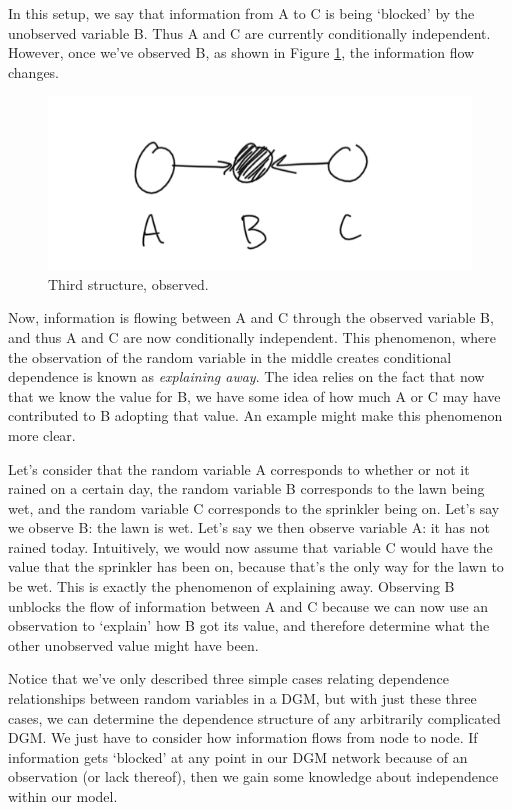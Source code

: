 In this setup, we say that information from A to C is being `blocked' by the unobserved variable B. Thus A and C are currently conditionally independent. However, once we've observed B, as shown in Figure \ref{fig:third-case-observed}, the information flow changes.
\begin{figure}
	\centering
	\includegraphics[width=0.5\paperwidth]{../GraphicalModels/fig/third-case-observed.png}
	\caption{Third structure, observed.}
	\label{fig:third-case-observed}
\end{figure}

Now, information is flowing between A and C through the observed variable B, and thus A and C are now conditionally independent. This phenomenon, where the observation of the random variable in the middle creates conditional dependence is known as \textit{explaining away}. The idea relies on the fact that now that we know the value for B, we have some idea of how much A or C may have contributed to B adopting that value. An example might make this phenomenon more clear.

Let's consider that the random variable A corresponds to whether or not it rained on a certain day, the random variable B corresponds to the lawn being wet, and the random variable C corresponds to the sprinkler being on. Let's say we observe B: the lawn is wet. Let's say we then observe variable A: it has not rained today. Intuitively, we would now assume that variable C would have the value that the sprinkler has been on, because that's the only way for the lawn to be wet. This is exactly the phenomenon of explaining away. Observing B unblocks the flow of information between A and C because we can now use an observation to `explain' how B got its value, and therefore determine what the other unobserved value might have been.

Notice that we've only described three simple cases relating dependence relationships between random variables in a DGM, but with just these three cases, we can determine the dependence structure of any arbitrarily complicated DGM. We just have to consider how information flows from node to node. If information gets `blocked' at any point in our DGM network because of an observation (or lack thereof), then we gain some knowledge about independence within our model.

